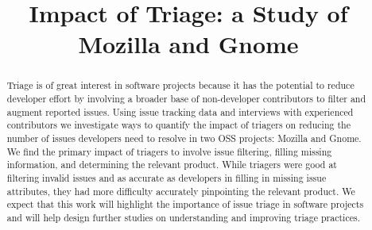 \documentclass[conference]{IEEEtran}
\begin{document}
\title{Impact of Triage: a Study of Mozilla and Gnome}

\author{
}

\maketitle

\begin{abstract}
  Triage is of great interest in software projects because it has
  the potential to reduce developer effort by involving a broader
  base of non-developer contributors to filter and augment reported
  issues.  Using issue tracking data and interviews with
  experienced contributors we investigate ways to quantify the
  impact of triagers on reducing the number of
  issues developers need to resolve in two OSS projects:
  Mozilla and Gnome. We find the primary impact of triagers to
  involve issue filtering, filling missing information, and
  determining the relevant product. While triagers were good at
  filtering invalid issues and as accurate as developers in filling
  in missing issue attributes, they had more difficulty accurately
  pinpointing the relevant product. We expect that this work will
  highlight the importance of issue triage in software
  projects and will help design further studies on understanding and
  improving triage practices.
\end{abstract}

\IEEEpeerreviewmaketitle
\end{document}
